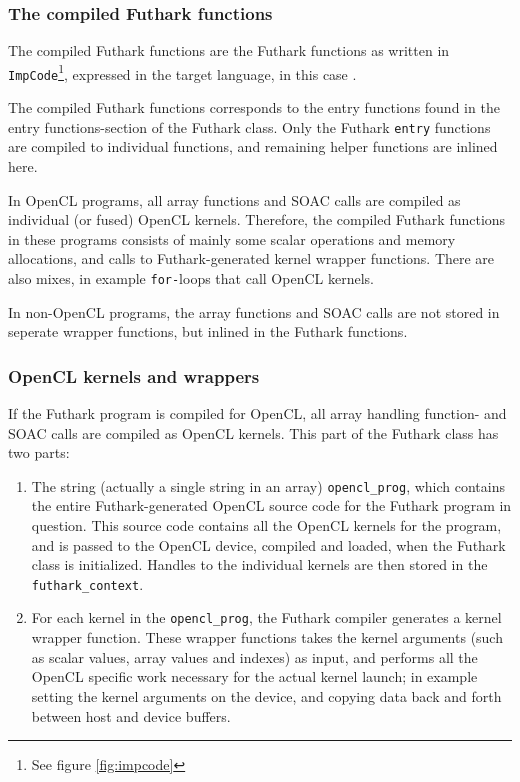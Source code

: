\subsubsection{The compiled Futhark functions}
  The compiled Futhark functions are the Futhark functions as written in
  \texttt{ImpCode}\footnote{See figure \ref{fig:impcode}}, expressed in the
  target language, in this case \csharp{}.

  The compiled Futhark functions corresponds to the entry functions found
  in the entry functions-section of the Futhark class.
  Only the Futhark \texttt{entry} functions are compiled to individual functions, and
  remaining helper functions are inlined here.

  In OpenCL programs, all array functions and SOAC calls are compiled as
  individual (or fused) OpenCL kernels. Therefore, the compiled Futhark
  functions in these programs consists of mainly some scalar operations and
  memory allocations, and calls to Futhark-generated kernel wrapper functions.
  There are also mixes, in example \texttt{for-}loops that call OpenCL kernels.
  
  In non-OpenCL programs, the array functions and SOAC calls are not stored in
  seperate wrapper functions, but inlined in the Futhark functions.

\subsubsection{OpenCL kernels and wrappers}
  If the Futhark program is compiled for OpenCL, all array handling function- and
  SOAC calls are compiled as OpenCL kernels. This part of the Futhark class
  has two parts:
  \begin{enumerate}
  \item The string (actually a single string in an array) \texttt{opencl\_prog}, which contains the entire
  Futhark-generated OpenCL source code for the Futhark program in question.
  This source code contains all the OpenCL kernels for the program, and is
  passed to the OpenCL device, compiled and loaded, when the Futhark class is
  initialized. Handles to the individual kernels are then stored in the \texttt{futhark\_context}.

  \item For each kernel in the \texttt{opencl\_prog}, the Futhark compiler
    generates a kernel wrapper function. These wrapper functions takes the
    kernel arguments (such as scalar values, array values and indexes) as input,
    and performs all the OpenCL specific work necessary for the actual kernel
    launch; in example setting the kernel arguments on the device, and copying
    data back and forth between host and device buffers.
  \end{enumerate}

